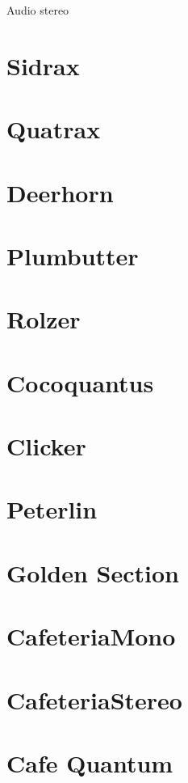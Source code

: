 Audio stereo

\chapter{Sidrax}

\introSidrax

\chapter{Quatrax}

\chapter{Deerhorn}


\chapter{Plumbutter}

\chapter{Rolzer}

\chapter{Cocoquantus}

\chapter{Clicker}

\chapter{Peterlin}

\chapter{Golden Section}

\chapter{Cafeteria\textunderscore Mono}

\chapter{Cafeteria\textunderscore Stereo}

\chapter{Cafe Quantum}



